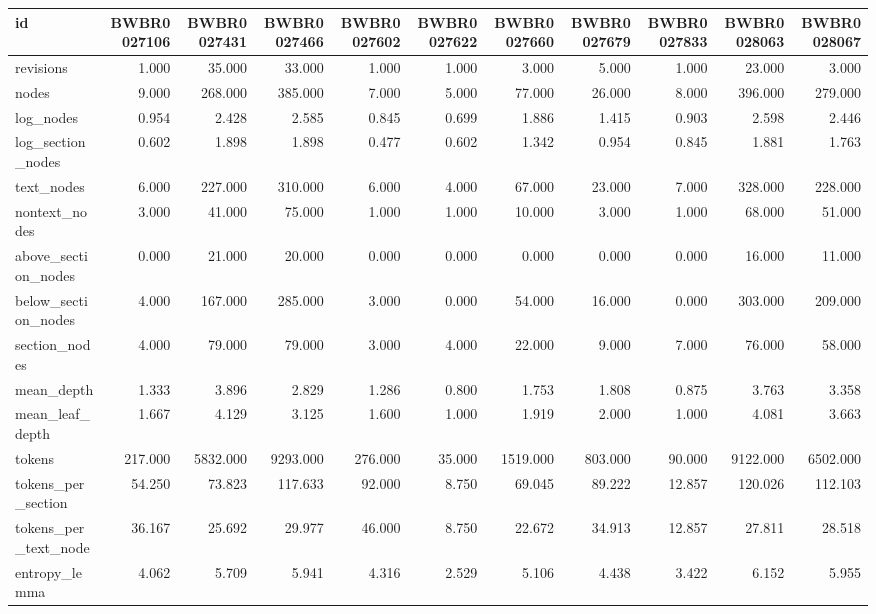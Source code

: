 \begin{tabular}{lrrrrrrrrrr}
\toprule
id & BWBR0027106 & BWBR0027431 & BWBR0027466 & BWBR0027602 & BWBR0027622 & BWBR0027660 & BWBR0027679 & BWBR0027833 & BWBR0028063 & BWBR0028067 \\
\midrule
revisions & 1.000 & 35.000 & 33.000 & 1.000 & 1.000 & 3.000 & 5.000 & 1.000 & 23.000 & 3.000 \\
\cline{1-11}
nodes & 9.000 & 268.000 & 385.000 & 7.000 & 5.000 & 77.000 & 26.000 & 8.000 & 396.000 & 279.000 \\
\cline{1-11}
log\_nodes & 0.954 & 2.428 & 2.585 & 0.845 & 0.699 & 1.886 & 1.415 & 0.903 & 2.598 & 2.446 \\
\cline{1-11}
log\_section\_nodes & 0.602 & 1.898 & 1.898 & 0.477 & 0.602 & 1.342 & 0.954 & 0.845 & 1.881 & 1.763 \\
\cline{1-11}
text\_nodes & 6.000 & 227.000 & 310.000 & 6.000 & 4.000 & 67.000 & 23.000 & 7.000 & 328.000 & 228.000 \\
\cline{1-11}
nontext\_nodes & 3.000 & 41.000 & 75.000 & 1.000 & 1.000 & 10.000 & 3.000 & 1.000 & 68.000 & 51.000 \\
\cline{1-11}
above\_section\_nodes & 0.000 & 21.000 & 20.000 & 0.000 & 0.000 & 0.000 & 0.000 & 0.000 & 16.000 & 11.000 \\
\cline{1-11}
below\_section\_nodes & 4.000 & 167.000 & 285.000 & 3.000 & 0.000 & 54.000 & 16.000 & 0.000 & 303.000 & 209.000 \\
\cline{1-11}
section\_nodes & 4.000 & 79.000 & 79.000 & 3.000 & 4.000 & 22.000 & 9.000 & 7.000 & 76.000 & 58.000 \\
\cline{1-11}
mean\_depth & 1.333 & 3.896 & 2.829 & 1.286 & 0.800 & 1.753 & 1.808 & 0.875 & 3.763 & 3.358 \\
\cline{1-11}
mean\_leaf\_depth & 1.667 & 4.129 & 3.125 & 1.600 & 1.000 & 1.919 & 2.000 & 1.000 & 4.081 & 3.663 \\
\cline{1-11}
tokens & 217.000 & 5832.000 & 9293.000 & 276.000 & 35.000 & 1519.000 & 803.000 & 90.000 & 9122.000 & 6502.000 \\
\cline{1-11}
tokens\_per\_section & 54.250 & 73.823 & 117.633 & 92.000 & 8.750 & 69.045 & 89.222 & 12.857 & 120.026 & 112.103 \\
\cline{1-11}
tokens\_per\_text\_node & 36.167 & 25.692 & 29.977 & 46.000 & 8.750 & 22.672 & 34.913 & 12.857 & 27.811 & 28.518 \\
\cline{1-11}
entropy\_lemma & 4.062 & 5.709 & 5.941 & 4.316 & 2.529 & 5.106 & 4.438 & 3.422 & 6.152 & 5.955 \\

\end{tabular}
